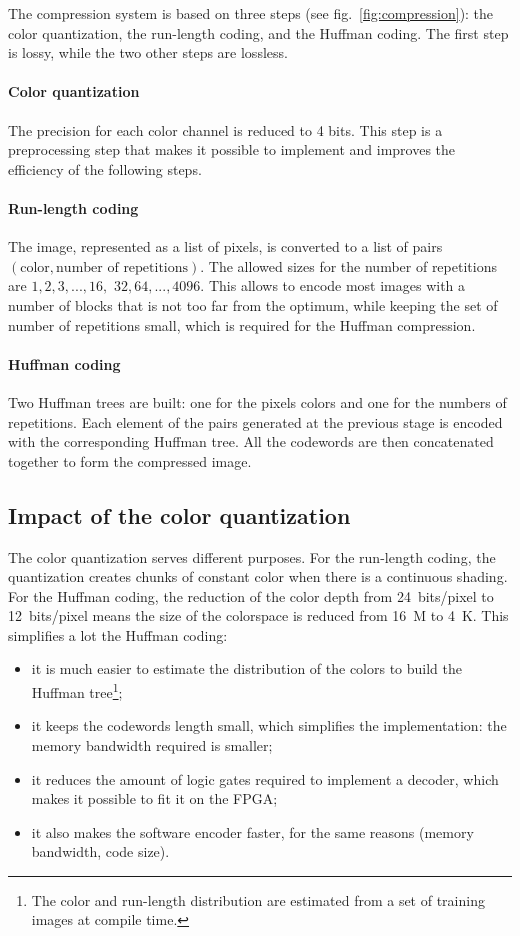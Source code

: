 \documentclass[english, DIV=13]{scrreprt}
\begin{document}
The compression system is based on three steps (see fig.~\ref{fig:compression}):
the color quantization, the run-length coding, and the Huffman coding. The first
step is lossy, while the two other steps are lossless.

\paragraph{Color quantization} The precision for each color channel is
reduced to 4 bits. This step is a preprocessing step that makes it possible
to implement and improves the efficiency of the following steps.

\paragraph{Run-length coding} The image, represented as a list of pixels,
is converted to a list of pairs $(\text{color}, \text{number of repetitions})$.
The allowed sizes for the number of repetitions are
$1, 2, 3, ..., 16,$ $32, 64, ..., 4096$. This allows to encode most images with
a number of blocks that is not too far from the optimum, while keeping the set
of number of repetitions small, which is required for the Huffman compression.

\paragraph{Huffman coding} Two Huffman trees are built: one for the pixels colors
and one for the numbers of repetitions. Each element of the pairs generated
at the previous stage is encoded with the corresponding Huffman tree.
All the codewords are then concatenated together to form the compressed image.

\subsection{Impact of the color quantization}

The color quantization serves different purposes. For the run-length coding,
the quantization creates chunks of constant color when there is a
continuous shading. For the Huffman
coding, the reduction of the color depth from \SI{24}{bits/pixel} to
\SI{12}{bits/pixel} means the size of the colorspace is reduced from
\SI{16}{M} to \SI{4}{K}. This simplifies a lot the Huffman coding:
\begin{itemize}
    \item it is much easier to estimate the distribution of the colors
    to build the Huffman tree\footnote{The color and run-length distribution are
    estimated from a set of training images at compile time.};
    \item it keeps the codewords length small, which simplifies the implementation:
    the memory bandwidth required is smaller;
    \item it reduces the amount of logic gates required to implement a decoder,
    which makes it possible to fit it on the FPGA;
    \item it also makes the software encoder faster, for the same reasons
    (memory bandwidth, code size).
\end{itemize}
\end{document}
